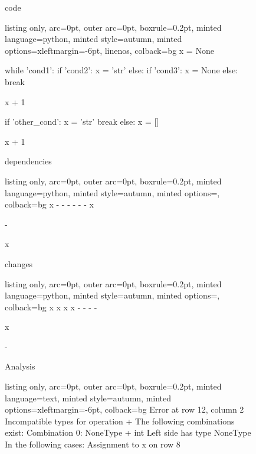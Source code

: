 \begin{figure}[!h]
 \begin{minipage}{0.32\textwidth}
 code
  \begin{tcblisting}{listing only, 
    arc=0pt,
    outer arc=0pt, 
    boxrule=0.2pt,
    minted language=python,
    minted style=autumn,
    minted options={xleftmargin=-6pt, linenos},
    colback=bg }
x = None

while 'cond1': 
  if 'cond2': 
    x = 'str'
  else:
    if 'cond3':
      x = None
    else:
      break

  x + 1

  if 'other_cond':
    x = 'str'
    break
  else:
    x = []

x + 1
\end{tcblisting}
 \end{minipage}
 \begin{minipage}{0.32\textwidth}
 dependencies
  \begin{tcblisting}{listing only, 
    arc=0pt,
    outer arc=0pt, 
    boxrule=0.2pt,
    minted language=python,
    minted style=autumn,
    minted options={},
    colback=bg }
x
-
-
-
-
-
-
x

-

x
\end{tcblisting}
 \end{minipage}
 \begin{minipage}{0.32\textwidth}
 changes
  \begin{tcblisting}{listing only, 
    arc=0pt,
    outer arc=0pt, 
    boxrule=0.2pt,
    minted language=python,
    minted style=autumn,
    minted options={},
    colback=bg }
x
x
x
x
-
-
-
-

x

-
\end{tcblisting}
 \end{minipage}
 \begin{minipage}{\textwidth}
  \vspace{4pt}
 \begin{minipage}{0.5\textwidth}
 \vspace{-148pt}
 Analysis
  \begin{tcblisting}{listing only, 
    arc=0pt,
    outer arc=0pt, 
    boxrule=0.2pt,
    minted language=text,
    minted style=autumn,
    minted options={xleftmargin=-6pt},
    colback=bg }
Error at row 12, column 2
 Incompatible types for operation +
 The following combinations exist:
 Combination 0: NoneType + int
  Left side has type NoneType
  In the following cases:
   Assignment to x on row 8


\end{tcblisting}
\end{minipage}
\end{minipage}
\end{figure}
